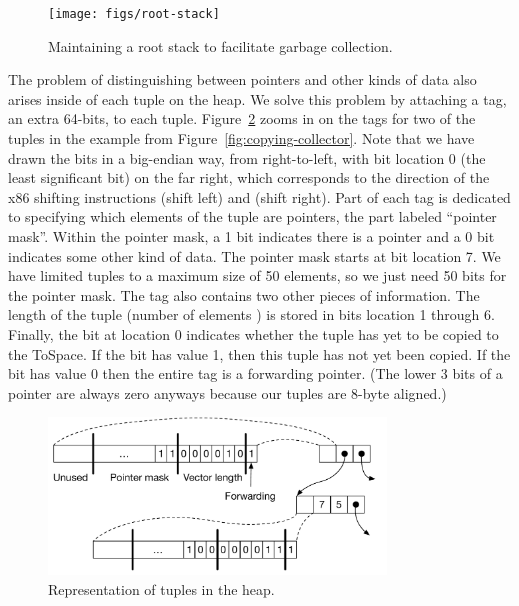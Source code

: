 \documentclass[11pt]{book}
\newcommand{\ocaml}[1]{{\color{blue}{#1}}}
\begin{document}
{\begin{figure}[tbp]
\centering \texttt{[image: figs/root-stack]}
\caption{Maintaining a root stack to facilitate garbage collection.}
\label{fig:shadow-stack}
\end{figure}

The problem of distinguishing between pointers and other kinds of data
also arises inside of each tuple on the heap. We solve this problem by
attaching a tag, an extra 64-bits, to each
tuple. Figure~\ref{fig:tuple-rep} zooms in on the tags for two of the
tuples in the example from Figure~\ref{fig:copying-collector}. Note
that we have drawn the bits in a big-endian way, from right-to-left,
with bit location 0 (the least significant bit) on the far right,
which corresponds to the direction of the x86 shifting instructions
 (shift left) and  (shift right). Part of each tag
is dedicated to specifying which elements of the tuple are pointers,
the part labeled ``pointer mask''. Within the pointer mask, a 1 bit
indicates there is a pointer and a 0 bit indicates some other kind of
data. \ocaml{The least significant bit corresponds to the status of the
  first tuple element, the next-least signficant to the second tuple element, and so on.
The tag itself is not considered an element, and so does not get a corresponding bit.}
The pointer mask starts at bit location 7. We have limited
tuples to a maximum size of 50 elements, so we just need 50 bits for
the pointer mask. The tag also contains two other pieces of
information. The length of the tuple (number of elements \ocaml{not including the tag itself}) is stored in
bits location 1 through 6. Finally, the bit at location 0 indicates
whether the tuple has yet to be copied to the ToSpace.  If the bit has
value 1, then this tuple has not yet been copied.  If the bit has
value 0 then the entire tag is a forwarding pointer. (The lower 3 bits
of a pointer are always zero anyways because our tuples are 8-byte
aligned.)

\begin{figure}[tbp]
\centering \includegraphics[width=0.8\textwidth]{figs/tuple-rep}
\caption{Representation of tuples in the heap.}
\label{fig:tuple-rep}
\end{figure}

}
\end{document}
